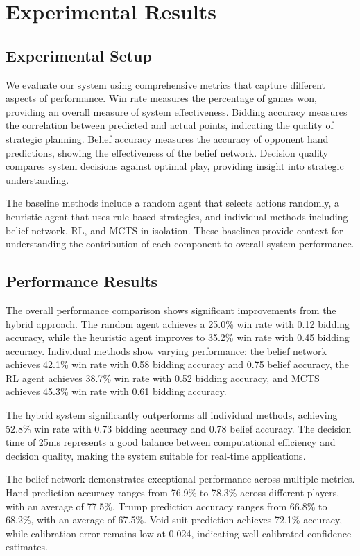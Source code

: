 \documentclass[conference]{IEEEtran}
\begin{document}
\section{Experimental Results}

\subsection{Experimental Setup}

We evaluate our system using comprehensive metrics that capture different aspects of performance. Win rate measures the percentage of games won, providing an overall measure of system effectiveness. Bidding accuracy measures the correlation between predicted and actual points, indicating the quality of strategic planning. Belief accuracy measures the accuracy of opponent hand predictions, showing the effectiveness of the belief network. Decision quality compares system decisions against optimal play, providing insight into strategic understanding.

The baseline methods include a random agent that selects actions randomly, a heuristic agent that uses rule-based strategies, and individual methods including belief network, RL, and MCTS in isolation. These baselines provide context for understanding the contribution of each component to overall system performance.

\subsection{Performance Results}

The overall performance comparison shows significant improvements from the hybrid approach. The random agent achieves a 25.0\% win rate with 0.12 bidding accuracy, while the heuristic agent improves to 35.2\% win rate with 0.45 bidding accuracy. Individual methods show varying performance: the belief network achieves 42.1\% win rate with 0.58 bidding accuracy and 0.75 belief accuracy, the RL agent achieves 38.7\% win rate with 0.52 bidding accuracy, and MCTS achieves 45.3\% win rate with 0.61 bidding accuracy.

The hybrid system significantly outperforms all individual methods, achieving 52.8\% win rate with 0.73 bidding accuracy and 0.78 belief accuracy. The decision time of 25ms represents a good balance between computational efficiency and decision quality, making the system suitable for real-time applications.

The belief network demonstrates exceptional performance across multiple metrics. Hand prediction accuracy ranges from 76.9\% to 78.3\% across different players, with an average of 77.5\%. Trump prediction accuracy ranges from 66.8\% to 68.2\%, with an average of 67.5\%. Void suit prediction achieves 72.1\% accuracy, while calibration error remains low at 0.024, indicating well-calibrated confidence estimates.
\end{document}
